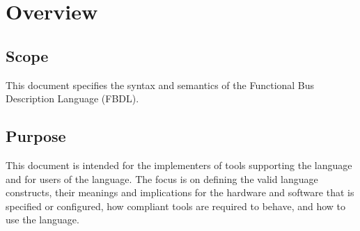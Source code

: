 \chapter{Overview}

\section{Scope}

This document specifies the syntax and semantics of the Functional Bus Description Language (FBDL).

\section{Purpose}

This document is intended for the implementers of tools supporting the language and for users of the language.
The focus is on defining the valid language constructs, their meanings and implications for the hardware and software that is specified or configured, how compliant tools are required to behave, and how to use the language.

